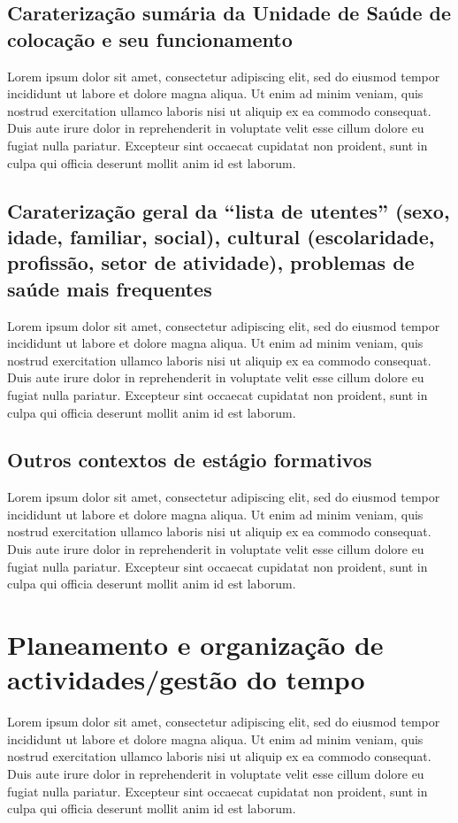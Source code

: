 \documentclass{report}
\begin{document}
\subsection{Caraterização sumária da Unidade de Saúde de colocação e seu funcionamento}
Lorem ipsum dolor sit amet, consectetur adipiscing elit, sed do eiusmod tempor incididunt ut labore et dolore magna aliqua. Ut enim ad minim veniam, quis nostrud exercitation ullamco laboris nisi ut aliquip ex ea commodo consequat. Duis aute irure dolor in reprehenderit in voluptate velit esse cillum dolore eu fugiat nulla pariatur. Excepteur sint occaecat cupidatat non proident, sunt in culpa qui officia deserunt mollit anim id est laborum.
\subsection{Caraterização geral da “lista de utentes” (sexo, idade, familiar, social), cultural (escolaridade, profissão, setor de atividade), problemas de saúde mais frequentes}
Lorem ipsum dolor sit amet, consectetur adipiscing elit, sed do eiusmod tempor incididunt ut labore et dolore magna aliqua. Ut enim ad minim veniam, quis nostrud exercitation ullamco laboris nisi ut aliquip ex ea commodo consequat. Duis aute irure dolor in reprehenderit in voluptate velit esse cillum dolore eu fugiat nulla pariatur. Excepteur sint occaecat cupidatat non proident, sunt in culpa qui officia deserunt mollit anim id est laborum.
\subsection{Outros contextos de estágio formativos}
Lorem ipsum dolor sit amet, consectetur adipiscing elit, sed do eiusmod tempor incididunt ut labore et dolore magna aliqua. Ut enim ad minim veniam, quis nostrud exercitation ullamco laboris nisi ut aliquip ex ea commodo consequat. Duis aute irure dolor in reprehenderit in voluptate velit esse cillum dolore eu fugiat nulla pariatur. Excepteur sint occaecat cupidatat non proident, sunt in culpa qui officia deserunt mollit anim id est laborum.

\section{Planeamento e organização de actividades/gestão do tempo}
Lorem ipsum dolor sit amet, consectetur adipiscing elit, sed do eiusmod tempor incididunt ut labore et dolore magna aliqua. Ut enim ad minim veniam, quis nostrud exercitation ullamco laboris nisi ut aliquip ex ea commodo consequat. Duis aute irure dolor in reprehenderit in voluptate velit esse cillum dolore eu fugiat nulla pariatur. Excepteur sint occaecat cupidatat non proident, sunt in culpa qui officia deserunt mollit anim id est laborum.
\end{document}
